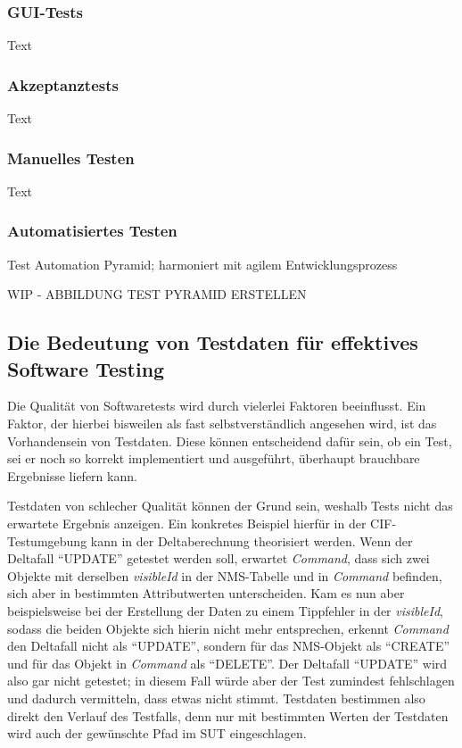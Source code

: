 \subsubsection*{GUI-Tests}\label{subsubsec:guitests}
Text

\subsubsection*{Akzeptanztests}\label{subsubsec:akzeptanztests}
Text

\subsubsection*{Manuelles Testen}\label{subsubsec:manuelltest}
Text

\subsubsection*{Automatisiertes Testen}\label{subsubsec:autotest}
Test Automation Pyramid; harmoniert mit agilem Entwicklungsprozess \cite{contan:2018}

WIP - ABBILDUNG TEST PYRAMID ERSTELLEN

\subsection{Die Bedeutung von Testdaten für effektives Software Testing}\label{subsec:testdaten}
Die Qualität von Softwaretests wird durch vielerlei Faktoren beeinflusst. Ein Faktor, der hierbei bisweilen als fast selbstverständlich angesehen wird, ist das Vorhandensein von Testdaten. Diese können entscheidend dafür sein, ob ein Test, sei er noch so korrekt implementiert und ausgeführt, überhaupt brauchbare Ergebnisse liefern kann.

Testdaten von schlecher Qualität können der Grund sein, weshalb Tests nicht das erwartete Ergebnis anzeigen. \cite[S. 137]{oregan:2019} Ein konkretes Beispiel hierfür in der \ac{CIF}-Testumgebung kann in der Deltaberechnung theorisiert werden. Wenn der Deltafall \enquote{UPDATE} getestet werden soll, erwartet \textit{Command}, dass sich zwei Objekte mit derselben \textit{visibleId} in der \ac{NMS}-Tabelle und in \textit{Command} befinden, sich aber in bestimmten Attributwerten unterscheiden. Kam es nun aber beispielsweise bei der Erstellung der Daten zu einem Tippfehler in der \textit{visibleId}, sodass die beiden Objekte sich hierin nicht mehr entsprechen, erkennt \textit{Command} den Deltafall nicht als \enquote{UPDATE}, sondern für das \ac{NMS}-Objekt als \enquote{CREATE} und für das Objekt in \textit{Command} als \enquote{DELETE}. Der Deltafall \enquote{UPDATE} wird also gar nicht getestet; in diesem Fall würde aber der Test zumindest fehlschlagen und dadurch vermitteln, dass etwas nicht stimmt. Testdaten bestimmen also direkt den Verlauf des Testfalls, denn nur mit bestimmten Werten der Testdaten wird auch der gewünschte Pfad im \ac{SUT} eingeschlagen. \cite[S. 221]{witte:2019}

